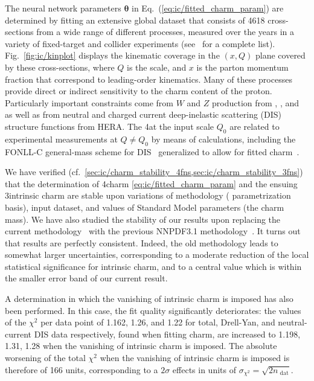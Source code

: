The neural network parameters ${\boldsymbol \theta}$ in
Eq.~(\ref{eq:ic/fitted_charm_param})
are determined by fitting an extensive global dataset that consists of 4618 
cross-sections from a wide range of different processes, measured over
the years in a variety of fixed-target and collider experiments  (see~\cite{Ball:2021leu} for a complete list).
%
Fig.~\ref{fig:ic/kinplot} displays the kinematic coverage in the $(x,Q)$ plane
covered by these cross-sections, where $Q$ is
the  scale, and  $x$ is
the parton momentum fraction that correspond to leading-order kinematics.
%
Many of these processes provide direct or indirect sensitivity 
to the charm content of the proton.
%
Particularly important constraints come from $W$ and $Z$ production from 
\atlas, \cms, and \lhcb as well as from
neutral and charged current deep-inelastic 
scattering (DIS) structure functions from HERA.
%
The 4\fns  \pdfs at the input scale $Q_0$ are related
to experimental measurements at $Q \not =Q_0$ by means of \nnlo \qcd calculations, including
the FONLL-C general-mass scheme for DIS~\cite{Forte:2010ta} generalized to 
allow for fitted charm~\cite{Ball:2015tna}.

We have verified (cf.\
\cref{sec:ic/charm_stability_4fns,sec:ic/charm_stability_3fns}) that the
determination of 4\fns charm \pdf \cref{eq:ic/fitted_charm_param} and the ensuing
3\fns intrinsic charm \pdf are  stable upon variations of methodology (\pdf
parametrization basis), input dataset, and values of Standard Model parameters
(the charm mass).
We have also studied the stability of our results upon replacing the
current \nnpdfr{4.0} methodology~\cite{Ball:2021leu} with the previous
NNPDF3.1 methodology~\cite{NNPDF:2017mvq}. It turns out that results
are  perfectly consistent. Indeed, the old methodology leads to somewhat larger
uncertainties, corresponding to a moderate reduction of the local statistical
significance for intrinsic charm, and to a central value which is
within the smaller  error band of our current result.


A determination in which the vanishing of intrinsic charm is
imposed has also been performed.
%
In this case, the fit quality significantly
deteriorates: the values of the $\chi^2$ per data point of 1.162,
1.26, and 1.22 for total, Drell-Yan, 
and neutral-current DIS data respectively, found when fitting charm, are 
increased to 1.198, 1.31, 1.28 when the vanishing of intrinsic charm
is imposed.
%
The absolute worsening of the total $\chi^2$ when the vanishing of intrinsic charm is imposed is therefore
of 166 units, corresponding to
a $2\sigma$ effects in units of $\sigma_{\chi^2}= \sqrt{2n_\textrm{ dat}}$.

